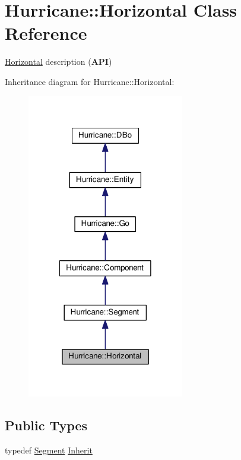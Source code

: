 \hypertarget{classHurricane_1_1Horizontal}{\section{Hurricane\-:\-:Horizontal Class Reference}
\label{classHurricane_1_1Horizontal}
}


\hyperlink{classHurricane_1_1Horizontal}{Horizontal} description ({\bfseries A\-P\-I})  




Inheritance diagram for Hurricane\-:\-:Horizontal\-:\nopagebreak
\begin{figure}[H]
\begin{center}
\leavevmode
\includegraphics[width=194pt]{classHurricane_1_1Horizontal__inherit__graph}
\end{center}
\end{figure}
\subsection*{Public Types}
\begin{DoxyCompactItemize}
\item 
typedef \hyperlink{classHurricane_1_1Segment}{Segment} \hyperlink{classHurricane_1_1Horizontal_a43266e3530dc5872f4eabf16eba86bdb}{Inherit}
\end{DoxyCompactItemize}
